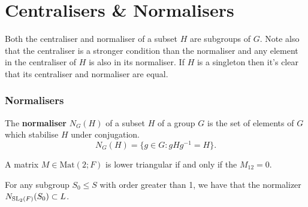 \section{Centralisers \& Normalisers}

Both the centraliser and normaliser of a subset $H$ are subgroups of $G$. Note also that the centraliser is a stronger condition than the normaliser and any element in the centraliser of $H$ is also in its normaliser. If $H$ is a singleton then it's clear that its centraliser and normaliser are equal.\\

\subsubsection{Normalisers}

\begin{definition}
\leanok
The \textbf{normaliser} $N_G(H)$ of a subset $H$ of a group $G$ is the set of elements of $G$ which stabilise $H$ under conjugation.
\begin{equation*} N_G(H) = \{ g \in G : gHg^{-1}=H\}. \end{equation*}
\end{definition}


\begin{remark}
    \label{lower_triangular_iff_top_right_entry_eq_zero}
    \leanok
    A matrix $M \in \textrm{Mat}(2; F)$ is lower triangular if and only if the $M_{12} = 0$.
\end{remark}

\begin{proposition}
\label{normalizer_subgroup_S_le_L}
\leanok
 For any subgroup $S_0 \leq S$ with order greater than 1, we have that the normalizer $N_{\operatorname{SL}_2(F)}(S_0) \subset L$.
\end{proposition}


